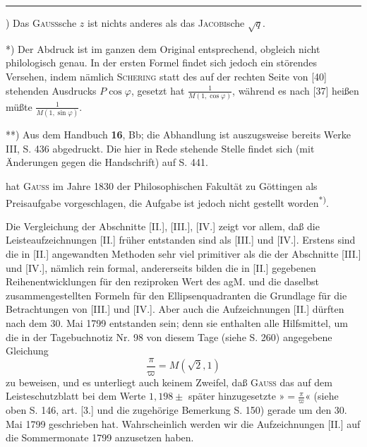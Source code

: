 \par\smallskip\noindent\rule{.25\linewidth}{.4pt}\par
{\small
\par\indent *) Das \textsc{Gauss}sche $z$ ist nichts anderes als das \textsc{Jacobi}sche $\sqrt q$.
\par\indent **) Der Abdruck ist im ganzen dem Original entsprechend, obgleich nicht philologisch genau. In der ersten Formel findet sich jedoch ein störendes Versehen, indem nämlich \textsc{Schering} statt des auf der rechten Seite von [40] stehenden Ausdrucks $P\cos\varphi$, gesetzt hat $\frac1{M(1,\cos\varphi)}$, während es nach [37] heißen müßte $\frac1{M(1,\sin\varphi)}$.
\par\indent ***) Aus dem Handbuch \textbf{16}, Bb; die Abhandlung ist auszugsweise bereits Werke III, S. 436 abgedruckt. Die hier in Rede stehende Stelle findet sich (mit Änderungen gegen die Handschrift) auf S. 441.
\par}
\clearpage
\fancyhead{}
\noindent hat \textsc{Gauss} im Jahre 1830 der Philosophischen Fakultät zu Göttingen als Preisaufgabe vorgeschlagen, die Aufgabe ist jedoch nicht gestellt worden\textsuperscript{*)}.
\par\indent Die Vergleichung der Abschnitte [II.], [III.], [IV.] zeigt vor allem, daß die Leisteaufzeichnungen [II.] früher entstanden sind als [III.] und [IV.]. Erstens sind die in [II.] angewandten Methoden sehr viel primitiver als die der Abschnitte [III.] und [IV.], nämlich rein formal, andererseits bilden die in [II.] gegebenen Reihenentwicklungen für den reziproken Wert des agM. und die daselbst zusammengestellten Formeln für den Ellipsenquadranten die Grundlage für die Betrachtungen von [III.] und [IV.]. Aber auch die Aufzeichnungen [II.] dürften nach dem 30. Mai 1799 entstanden sein; denn sie enthalten alle Hilfsmittel, um die in der Tagebuchnotiz Nr. 98 von diesem Tage (siehe S. 260) angegebene Gleichung
\[\frac\pi\varpi=M(\surd2,1)\]
\noindent zu beweisen, und es unterliegt auch keinem Zweifel, daß \textsc{Gauss} das auf dem Leisteschutzblatt bei dem Werte $1{,}198\pm$ später hinzugesetzte »$=\frac\pi\varpi$« (siehe oben S. 146, art. [3.] und die zugehörige Bemerkung S. 150) gerade um den 30. Mai 1799 geschrieben hat. Wahrscheinlich werden wir die Aufzeichnungen [II.] auf die Sommermonate 1799 anzusetzen haben.
